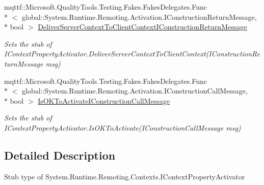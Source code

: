 \begin{DoxyCompactItemize}
mqttf\-::\-Microsoft.\-Quality\-Tools.\-Testing.\-Fakes.\-Fakes\-Delegates.\-Func\\*
$<$ global\-::\-System.\-Runtime.\-Remoting.\-Activation.\-I\-Construction\-Return\-Message, \\*
bool $>$ \hyperlink{class_system_1_1_runtime_1_1_remoting_1_1_contexts_1_1_fakes_1_1_stub_i_context_property_activator_ae352d585d2a60af1cec3683835e3a9ca}{Deliver\-Server\-Context\-To\-Client\-Context\-I\-Construction\-Return\-Message}
\begin{DoxyCompactList}\small\item\em Sets the stub of I\-Context\-Property\-Activator.\-Deliver\-Server\-Context\-To\-Client\-Context(\-I\-Construction\-Return\-Message msg)\end{DoxyCompactList}\item 
mqttf\-::\-Microsoft.\-Quality\-Tools.\-Testing.\-Fakes.\-Fakes\-Delegates.\-Func\\*
$<$ global\-::\-System.\-Runtime.\-Remoting.\-Activation.\-I\-Construction\-Call\-Message, \\*
bool $>$ \hyperlink{class_system_1_1_runtime_1_1_remoting_1_1_contexts_1_1_fakes_1_1_stub_i_context_property_activator_a20977fdc4ad146bde15d7196ef24a071}{Is\-O\-K\-To\-Activate\-I\-Construction\-Call\-Message}
\begin{DoxyCompactList}\small\item\em Sets the stub of I\-Context\-Property\-Activator.\-Is\-O\-K\-To\-Activate(\-I\-Construction\-Call\-Message msg)\end{DoxyCompactList}\end{DoxyCompactItemize}


\subsection{Detailed Description}
Stub type of System.\-Runtime.\-Remoting.\-Contexts.\-I\-Context\-Property\-Activator



